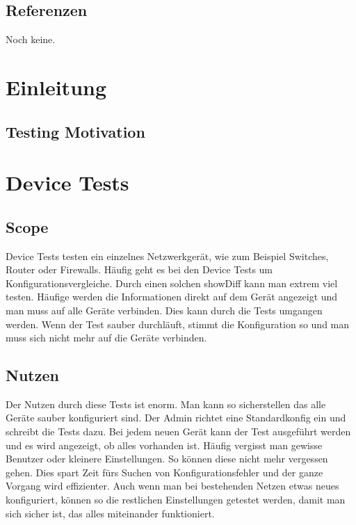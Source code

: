 \documentclass[a4,12pt]{scrartcl}
\begin{document}
\subsection{Referenzen}
\begin{description}
Noch keine.
\end{description}

\section{Einleitung}
\subsection{Testing Motivation}
\subsection{}

\section{Device Tests}
\subsection{Scope}
Device Tests testen ein einzelnes Netzwerkgerät, wie zum Beispiel Switches, Router oder Firewalls. Häufig geht es bei den Device Tests um Konfigurationsvergleiche. Durch einen solchen showDiff kann man extrem viel testen.\newline\newline
Häufige werden die Informationen direkt auf dem Gerät angezeigt und man muss auf alle Geräte verbinden. Dies kann durch die Tests umgangen werden. Wenn der Test sauber durchläuft, stimmt die Konfiguration so und man muss sich nicht mehr auf die Geräte verbinden.
\subsection{Nutzen}
Der Nutzen durch diese Tests ist enorm. Man kann so sicherstellen das alle Geräte sauber konfiguriert sind. Der Admin richtet eine Standardkonfig ein und schreibt die Tests dazu. Bei jedem neuen Gerät kann der Test ausgeführt werden und es wird angezeigt, ob alles vorhanden ist. Häufig vergisst man gewisse Benutzer oder kleinere Einstellungen. So können diese nicht mehr vergessen gehen.\newline\newline
Dies spart Zeit fürs Suchen von Konfigurationsfehler und der ganze Vorgang wird effizienter. Auch wenn man bei bestehenden Netzen etwas neues konfiguriert, können so die restlichen Einstellungen getestet werden, damit man sich sicher ist, das alles miteinander funktioniert.
\end{document}

